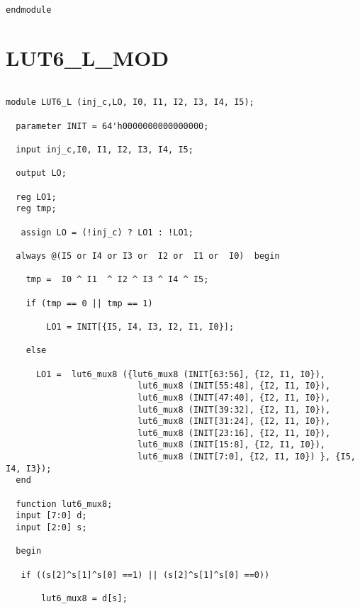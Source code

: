 \begin{lstlisting}
endmodule

\end{lstlisting}

\section{LUT6\_L\_MOD}
\begin{lstlisting}

module LUT6_L (inj_c,LO, I0, I1, I2, I3, I4, I5);

  parameter INIT = 64'h0000000000000000;

  input inj_c,I0, I1, I2, I3, I4, I5;

  output LO;

  reg LO1;
  reg tmp;
  
   assign LO = (!inj_c) ? LO1 : !LO1;

  always @(I5 or I4 or I3 or  I2 or  I1 or  I0)  begin
 
    tmp =  I0 ^ I1  ^ I2 ^ I3 ^ I4 ^ I5;

    if (tmp == 0 || tmp == 1)

        LO1 = INIT[{I5, I4, I3, I2, I1, I0}];

    else 
    
      LO1 =  lut6_mux8 ({lut6_mux8 (INIT[63:56], {I2, I1, I0}),
                          lut6_mux8 (INIT[55:48], {I2, I1, I0}),
                          lut6_mux8 (INIT[47:40], {I2, I1, I0}),
                          lut6_mux8 (INIT[39:32], {I2, I1, I0}),
                          lut6_mux8 (INIT[31:24], {I2, I1, I0}),
                          lut6_mux8 (INIT[23:16], {I2, I1, I0}),
                          lut6_mux8 (INIT[15:8], {I2, I1, I0}),
                          lut6_mux8 (INIT[7:0], {I2, I1, I0}) }, {I5, I4, I3});
  end

  function lut6_mux8;
  input [7:0] d;
  input [2:0] s;
   
  begin

   if ((s[2]^s[1]^s[0] ==1) || (s[2]^s[1]^s[0] ==0))
           
       lut6_mux8 = d[s];


\end{lstlisting}
